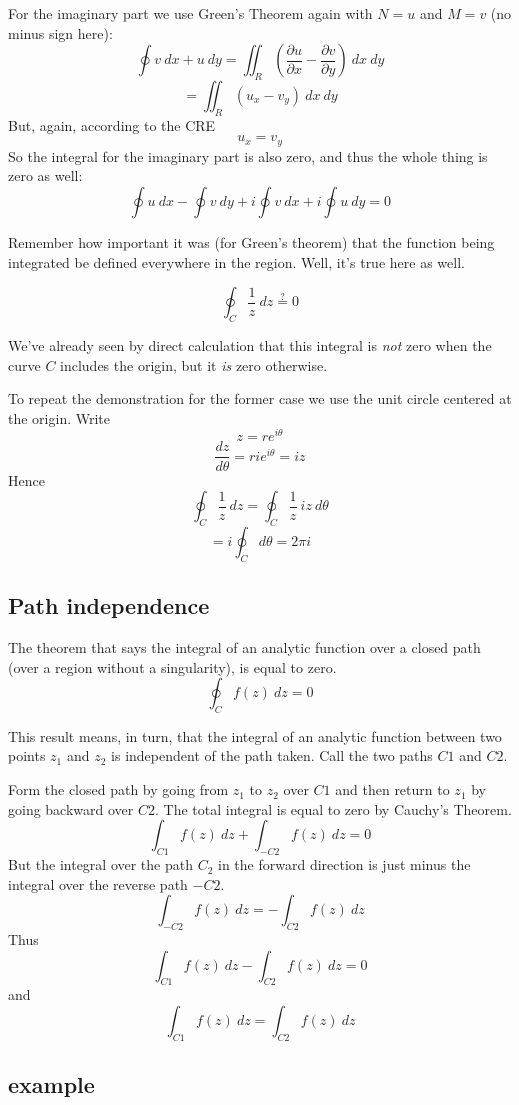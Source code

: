 \documentclass[11pt, oneside]{article}   	%
\begin{document}
For the imaginary part we use Green's Theorem again with $N=u$ and $M = v$ (no minus sign here):
\[ \oint v \ dx + u \ dy =  \iint_R (\frac{\partial u}{\partial x} - \frac{\partial v}{\partial y}) \ dx \ dy \]
\[ =  \iint_R (u_x - v_y) \ dx \ dy \]
But, again, according to the CRE
\[ u_x = v_y \]
So the integral for the imaginary part is also zero, and thus the whole thing is zero as well:
\[ \oint u \ dx - \oint v \ dy + i \oint v \ dx + i \oint u \ dy = 0 \]

Remember how important it was (for Green's theorem) that the function being integrated be defined everywhere in the region.  Well, it's true here as well.

\[ \oint_C \frac{1}{z} \ dz \stackrel{?}{=} 0 \]

We've already seen by direct calculation that this integral is \emph{not} zero when the curve $C$ includes the origin, but it \emph{is} zero otherwise.

To repeat the demonstration for the former case we use the unit circle centered at the origin.  Write
\[ z = r e^{i\theta} \]
\[  \frac{dz}{d\theta} = r i e^{i\theta} = iz \]
Hence
\[ \oint_C \frac{1}{z} \ dz = \oint_C \frac{1}{z} \ iz \ d \theta \]
\[ = i   \oint_C  d \theta = 2 \pi i \]

\subsection*{Path independence}
The theorem that says the integral of an analytic function over a closed path (over a region without a singularity), is equal to zero.
\[ \oint_C f(z) \ dz = 0 \]

This result means, in turn, that the integral of an analytic function between two points $z_1$ and $z_2$ is independent of the path taken.  Call the two paths $C1$ and $C2$.  

Form the closed path by going from $z_1$ to $z_2$ over $C1$ and then return to $z_1$ by going backward over $C2$.  The total integral is equal to zero by Cauchy's Theorem.
\[ \int_{C1} f(z) \ dz + \int_{-C2} f(z) \ dz = 0 \]
But the integral over the path $C_2$ in the forward direction is just minus the integral over the reverse path $-C2$.
\[ \int_{-C2} f(z) \ dz = - \int_{C2} f(z) \ dz \]
Thus
\[ \int_{C1} f(z) \ dz - \int_{C2} f(z) \ dz = 0 \]
and
\[ \int_{C1} f(z) \ dz = \int_{C2} f(z) \ dz \]

\subsection*{example}
\end{document}
